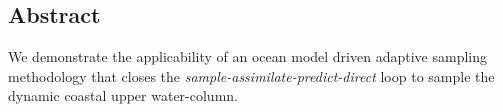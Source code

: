 \subsection{Abstract}

We demonstrate the applicability of an ocean model driven adaptive
sampling methodology that closes the
\emph{sample-assimilate-predict-direct} loop to sample the dynamic
coastal upper water-column. 